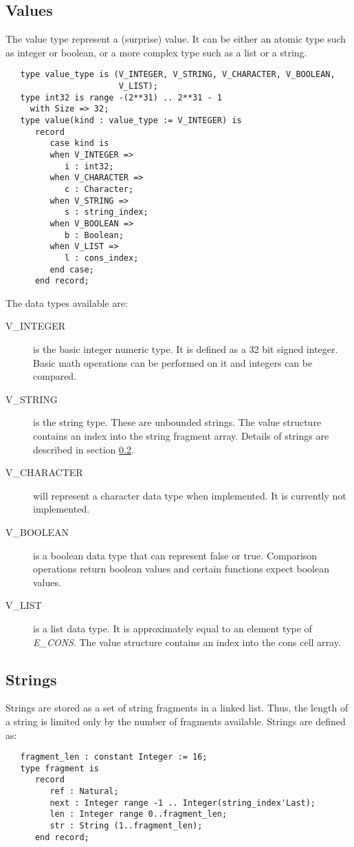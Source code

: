 \documentclass[10pt, openany]{book}
\begin{document}
\subsection{Values}
The value type represent a (surprise) value.  It can be either an atomic type such as integer or boolean, or a more complex type such as a list or a string.  
\begin{lstlisting}
   type value_type is (V_INTEGER, V_STRING, V_CHARACTER, V_BOOLEAN,
                       V_LIST);
   type int32 is range -(2**31) .. 2**31 - 1
     with Size => 32;
   type value(kind : value_type := V_INTEGER) is
      record
         case kind is
         when V_INTEGER =>
            i : int32;
         when V_CHARACTER =>
            c : Character;
         when V_STRING =>
            s : string_index;
         when V_BOOLEAN =>
            b : Boolean;
         when V_LIST =>
            l : cons_index;
         end case;
      end record;
\end{lstlisting}

The data types available are:
\begin{description}
  \item[V\_INTEGER] is the basic integer numeric type.  It is defined as a 32 bit signed integer.  Basic math operations can be performed on it and integers can be compared.
  \item[V\_STRING] is the string type.  These are unbounded strings.  The value structure contains an index into the string fragment array.  Details of strings are described in section \ref{sec:strings}.
  \item[V\_CHARACTER] will represent a character data type when implemented.  It is currently not implemented.
  \item[V\_BOOLEAN] is a boolean data type that can represent false or true.  Comparison operations return boolean values and certain functions expect boolean values.
  \item[V\_LIST] is a list data type.  It is approximately equal to an element type of \emph{E\_CONS}.  The value structure contains an index into the cons cell array.
\end{description}

\subsection{Strings}
\label{sec:strings}
Strings are stored as a set of string fragments in a linked list.  Thus, the length of a string is limited only by the number of fragments available.  Strings are defined as:
\begin{lstlisting}
   fragment_len : constant Integer := 16;
   type fragment is
      record
         ref : Natural;
         next : Integer range -1 .. Integer(string_index'Last);
         len : Integer range 0..fragment_len;
         str : String (1..fragment_len);
      end record;
\end{lstlisting}
\end{document}
